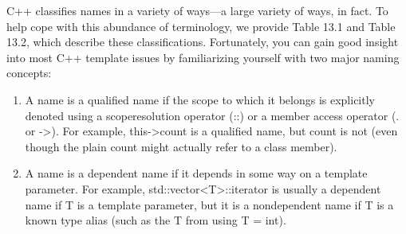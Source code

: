 C++ classifies names in a variety of ways—a large variety of ways, in fact. To help cope with this abundance of terminology, we provide Table 13.1 and Table 13.2, which describe these classifications. Fortunately, you can gain good insight into most C++ template issues by familiarizing yourself with two major naming concepts:

\begin{enumerate}
\item 
A name is a qualified name if the scope to which it belongs is explicitly denoted using a scoperesolution operator (::) or a member access operator (. or ->). For example, this->count is a qualified name, but count is not (even though the plain count might actually refer to a class member).

\item 
A name is a dependent name if it depends in some way on a template parameter. For example, std::vector<T>::iterator is usually a dependent name if T is a template parameter, but it is a nondependent name if T is a known type alias (such as the T from using T = int).
\end{enumerate}

